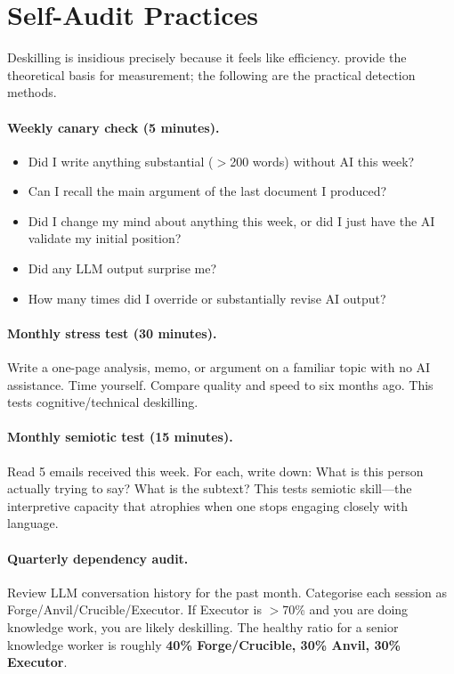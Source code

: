 \documentclass[11pt,a4paper]{article}
\begin{document}
\section{Self-Audit Practices}
\label{sec:audit}

Deskilling is insidious precisely because it feels like efficiency.
\citet{cabitza2023dominion} provide the theoretical basis for measurement; the
following are the practical detection methods.

\paragraph{Weekly canary check (5 minutes).}
\begin{itemize}
    \item Did I write anything substantial ($>$200 words) without AI this week?
    \item Can I recall the main argument of the last document I produced?
    \item Did I change my mind about anything this week, or did I just have the AI
    validate my initial position?
    \item Did any LLM output surprise me?
    \item How many times did I override or substantially revise AI output?
\end{itemize}

\paragraph{Monthly stress test (30 minutes).} Write a one-page analysis, memo, or
argument on a familiar topic with no AI assistance. Time yourself. Compare
quality and speed to six months ago. This tests cognitive/technical deskilling.

\paragraph{Monthly semiotic test (15 minutes).} Read 5 emails received this week.
For each, write down: What is this person actually trying to say? What is the
subtext? This tests semiotic skill---the interpretive capacity that atrophies when
one stops engaging closely with language.

\paragraph{Quarterly dependency audit.} Review LLM conversation history for the
past month. Categorise each session as Forge/Anvil/Crucible/Executor. If Executor
is $>$70\% and you are doing knowledge work, you are likely deskilling. The
healthy ratio for a senior knowledge worker is roughly \textbf{40\%
Forge/Crucible, 30\% Anvil, 30\% Executor}.
\end{document}
